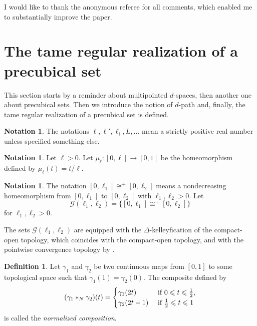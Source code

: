 \documentclass[a4paper,12pt]{amsart}
\theoremstyle{definition}
\newtheorem{defn}[thm]{Definition}
\newcommand{\bd}{\begin{defn}}
\newcommand{\ed}{\end{defn}}
\newtheorem{nota}[thm]{Notation}
\newcommand{\iso}{\cong}
\renewcommand{\leq}{\leqslant}
\begin{document}
I would like to thank the anonymous referee for all comments, which enabled me to substantially improve the paper.


\section{The tame regular realization of a precubical set}
\label{reg_sec}

This section starts by a reminder about multipointed $d$-spaces, then another one about precubical sets. Then we introduce the notion of $d$-path and, finally, the tame regular realization of a precubical set is defined.

\begin{nota}
	The notations $\ell,\ell',\ell_i,L,\dots$ mean a strictly positive real number unless specified something else.
\end{nota}

\begin{nota}
	Let $\ell>0$. Let $\mu_{\ell}:[0,\ell]\to [0,1]$ be the homeomorphism defined by $\mu_\ell(t) = t/\ell$. 
\end{nota}

\begin{nota} \label{defG}
	The notation $[0,\ell_1]\iso^+ [0,\ell_2]$ means a nondecreasing homeomorphism from $[0,\ell_1]$ to $[0,\ell_2]$ with $\ell_1,\ell_2>0$. Let \[\mathcal{G}(\ell_1,\ell_2)=\{[0,\ell_1] \iso^+ [0,\ell_2]\}\] for $\ell_1,\ell_2>0$. 
\end{nota}

The sets $\mathcal{G}(\ell_1,\ell_2)$ are equipped with the $\Delta$-kelleyfication of the compact-open topology, which coincides with the compact-open topology, and with the pointwise convergence topology by \cite[Proposition~2.5]{Moore2}.

\bd \label{composition_map} Let $\gamma_1$ and $\gamma_2$ be two continuous maps from $[0,1]$ to some topological space such that $\gamma_1(1)=\gamma_2(0)$. The composite defined by 
\[
(\gamma_1 *_N \gamma_2)(t) = \begin{cases}
\gamma_1(2t)& \hbox{ if }0\leq t\leq \frac{1}{2},\\
\gamma_2(2t-1)& \hbox{ if }\frac{1}{2}\leq t\leq 1
\end{cases}
\]
is called the \textit{normalized composition}.
\ed
\end{document}
